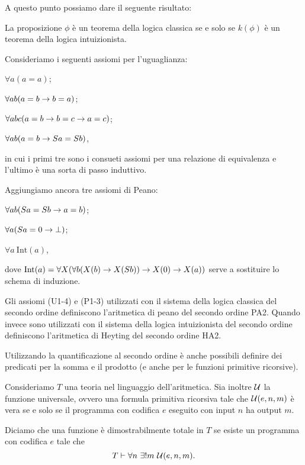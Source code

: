 \documentclass[]{marticle}
\begin{document}
A questo punto possiamo dare il seguente risultato:
\begin{block}[Proposizione]
    La proposizione $\phi$ \`e un teorema della logica classica se e solo se
    $k(\phi)$ \`e un teorema della logica intuizionista.
\end{block}

Consideriamo i seguenti assiomi per l'uguaglianza:
\begin{nlist}[U1]
    \item $\forall a (a=a)$;
    \item $\forall ab (a=b\rightarrow b=a)$;
    \item $\forall abc (a=b \rightarrow b=c \rightarrow a=c)$;
    \item $\forall ab(a=b \rightarrow Sa = Sb)$,
\end{nlist}
in cui i primi tre sono i consueti assiomi per una relazione di equivalenza e
l'ultimo \`e una sorta di passo induttivo.

Aggiungiamo ancora tre assiomi di Peano:
\begin{nlist}[P1]
    \item $\forall ab(Sa =Sb \rightarrow a = b)$;
    \item $\forall a(Sa=0 \rightarrow \bot)$;
    \item $\forall a\ \text{Int}(a)$,
\end{nlist}
dove $\text{Int}(a) = \forall X(\forall b (X(b)\rightarrow X(Sb)) \rightarrow X(0) \rightarrow X(a))$
serve a sostituire lo schema di induzione.

\begin{block}[Definizione]
    Gli assiomi (U1-4) e (P1-3) utilizzati con il sistema della logica classica
    del secondo ordine definiscono l'aritmetica di peano del secondo ordine PA2.
    Quando invece sono utilizzati con il sistema della logica intuizionista del
    secondo ordine definiscono l'aritmetica di Heyting del secondo ordine HA2.
\end{block}

Utilizzando la quantificazione al secondo ordine \`e anche possibili definire
dei predicati per la somma e il prodotto (e anche per le funzioni primitive
ricorsive).

Consideriamo $T$ una teoria nel linguaggio dell'aritmetica. Sia inoltre $\mathcal{U}$
la funzione universale, ovvero una formula primitiva ricorsiva tale che $\mathcal{U}
(e, n, m)$ \`e vera se e solo se il programma con codifica $e$ eseguito con
input $n$ ha output $m$. 

Diciamo che una funzione \`e dimostrabilmente totale in $T$ se esiste un
programma con codifica $e$ tale che
\[
    T \vdash \forall n\ \exists ! m\ \uni(e, n, m).
\]
\end{document}
